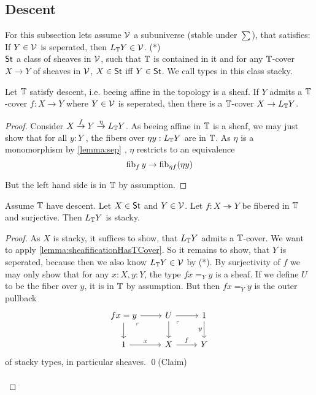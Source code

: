 
\subsection{Descent}
For this subsection lets assume $\mathcal{V}$ a subuniverse (stable under $\sum$), that satisfies: \\
If $Y \in \mathcal{V}$ is seperated, then $L_{\mathbb{T}} Y \in \mathcal{V}$. (*) \\
$\mathsf{St}$ a class of sheaves in $\mathcal{V}$, such that $\mathbb{T}$ is contained in it and for any $\mathbb{T}$-cover $X \to Y$ of sheaves in $\mathcal{V}$, $X \in \mathsf{St}$ iff $Y \in \mathsf{St}$. We call types in this class stacky.
\begin{lemma}{\label{lemma:sheafificationHasTCover}}
	Let $\mathbb{T}$ satisfy descent, i.e. beeing affine in the topology is a sheaf. If $Y$ admits a $\mathbb{T}$-cover $f : X \to Y$ where $Y \in \mathcal{V}$ is seperated, then there is a $\mathbb{T}$-cover $X \to L_{\mathbb{T}} Y$.
\end{lemma}
\begin{proof}
	
	Consider $X \overset{f}{\to} Y \overset{\eta}{\to} L_{\mathbb{T}} Y$. As beeing affine in $\mathbb{T}$ is  a sheaf, we may just show that for all $y : Y$ , the fibers over $\eta y : L_{\mathbb{T}} Y$ are in $\mathbb{T}$. As $\eta$ is a monomorphism by \ref{lemma:sep} , $\eta$ restricts to an equivalence
	\[
	\operatorname{fib}_f y \to \operatorname{fib}_{ \eta f}(\eta y)
	\]
	
	But the left hand side is in $\mathbb{T}$ by assumption. 
\end{proof}
\begin{lemma}
	Assume $\mathbb{T}$ have descent.
	Let $X \in \mathsf{St}$ and $Y \in \mathcal{V}$.	Let $f : X \twoheadrightarrow Y$ be fibered in $\mathbb{T}$ and surjective. Then $L_{\mathbb{T}} Y$ is stacky.
\end{lemma}
\begin{proof}
	As $X$ is stacky, it suffices to show, that $L_{\mathbb{T}} Y$ admits a $\mathbb{T}$-cover.
	We want to apply \ref{lemma:sheafificationHasTCover}. So it remains to show, that $Y$ is seperated, because then we  also know $L_{\mathbb{T}} Y \in \mathcal{V}$ by (*). By surjectivity of $f$ we may only show that for any $x : X, y : Y$, the type $f x =_Y y$ is a sheaf. If we define $U$ to be the fiber over $y$, it is in $\mathbb{T}$ by assumption. But then $f x =_Y y$ is the outer pullback
	\[\begin{tikzcd}
		{f x = y} & {U} & 1 \\
		\arrow["\ulcorner"{anchor=center, pos=0.125}, draw=none, from=1-1, to=2-2]
		1 & X & Y
		\arrow[from=1-1, to=1-2]
		\arrow[from=1-1, to=2-1]
		\arrow[from=1-2, to=1-3]
		\arrow[from=1-2, to=2-2]
		\arrow["\ulcorner"{anchor=center, pos=0.125}, draw=none, from=1-2, to=2-3]
		\arrow["y"', from=1-3, to=2-3]
		\arrow["x", from=2-1, to=2-2]
		\arrow["f", from=2-2, to=2-3]
	\end{tikzcd}\]
	of stacky types, in particular sheaves. \qed(Claim) \\\\
	
\end{proof}
